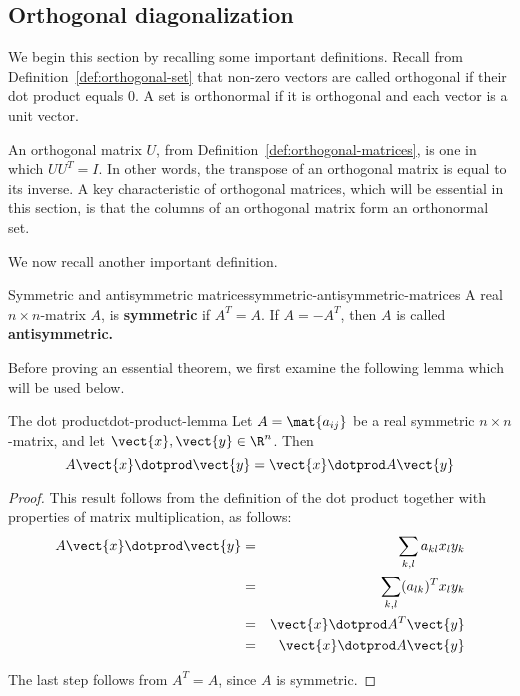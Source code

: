 \subsection{Orthogonal diagonalization}

We begin this section by recalling some important definitions. Recall from Definition~\ref{def:orthogonal-set} that non-zero vectors are called orthogonal if their dot product equals $0$.  A set is orthonormal if it is orthogonal and each vector is a unit vector.

An orthogonal matrix $U$, from Definition~\ref{def:orthogonal-matrices}, is one in which $UU^{T} = I$. In other words, the transpose of an orthogonal matrix is equal to its inverse. A key characteristic of orthogonal matrices, which will be essential in this section, is that the columns of an orthogonal matrix form an orthonormal set.

We now recall another important definition.

\begin{definition}{Symmetric and antisymmetric matrices}{symmetric-antisymmetric-matrices}
A real $n\times n$-matrix $A$, is \textbf{symmetric }if $A^{T}=A$. If $%
A=-A^{T}$, then $A$ is called \textbf{antisymmetric. }
\end{definition}

Before proving an essential theorem, we first examine the following lemma which will be used below.

\begin{lemma}{The dot product}{dot-product-lemma}
Let $A=\mat{a_{ij} }$ be a real symmetric $n \times n$-matrix, and let $\vect{x}, \vect{y} \in \R^n$. Then
\[
A\vect{x} \dotprod \vect{y} = \vect{x} \dotprod A \vect{y}
\]
\end{lemma}

\begin{proof}
This result follows from the definition of the dot product together with properties of matrix multiplication, as follows:
\begin{eqnarray*}
A\vect{x} \dotprod \vect{y} &=& \sum_{k,l}a_{kl}x_{l}y_{k} \\
&=&\sum_{k,l} (a_{lk})^Tx_{l}y_{k} \\
&=& \vect{x}\dotprod A^{T}\vect{y} \\
&=& \vect{x}\dotprod A \vect{y}
\end{eqnarray*}

The last step follows from $A^T = A$, since $A$ is symmetric.
\end{proof}

